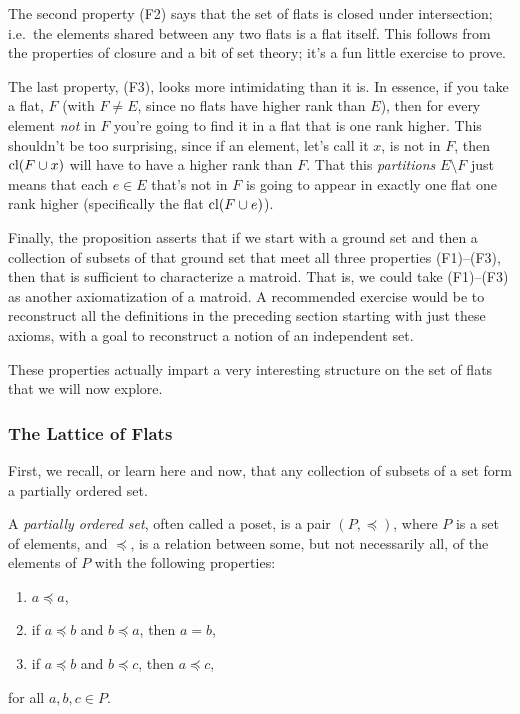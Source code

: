 \documentclass[12pt,oneside]{../../sfsuthesis}
\begin{document}
The second property (F2) says that the set of flats is closed under intersection;
i.e.\ the elements shared between any two flats is a flat itself.
This follows from the properties of closure and a bit of set theory; it's a fun little exercise to prove.

The last property, (F3), looks more intimidating than it is.
In essence, if you take a flat, \( F \) (with \( F \neq E \), since no flats have higher rank than \( E \)), then for every element \emph{not} in \( F \) you're going to find it in a flat that is one rank higher.
This shouldn't be too surprising, since if an element, let's call it \( x \), is not in \( F \), then \( \operatorname{cl}(F \cup x) \) will have to have a higher rank than \( F \).
That this \emph{partitions} \( E \setminus F \) just means that each \( e \in E \) that's not in \( F \) is going to appear in exactly one flat one rank higher (specifically the flat \( \operatorname{cl}(F \cup e) \)).

Finally, the proposition asserts that if we start with a ground set and then a collection of subsets of that ground set that meet all three properties (F1)--(F3), then that is sufficient to characterize a matroid.
That is, we could take (F1)--(F3) as another axiomatization of a matroid.
A recommended exercise would be to reconstruct all the definitions in the preceding section starting with just these axioms, with a goal to reconstruct a notion of an independent set.

These properties actually impart a very interesting structure on the set of flats that we will now explore.

\subsubsection{The Lattice of Flats}

First, we recall, or learn here and now, that any collection of subsets of a set form a partially ordered set.

\begin{definition}\th\label{def:poset}
    A \emph{partially ordered set}, often called a poset, is a pair \( (P, \preceq) \), where \( P \) is a set of elements, and \( \preceq \), is a relation between some, but not necessarily all, of the elements of \( P \) with the following properties:
    \begin{enumerate}[label=\roman*.]
        \item\(a \preceq a\),
        \item if \( a \preceq b \) and \( b \preceq a \), then \( a = b \),
        \item if \( a \preceq b \) and \( b \preceq c \), then \( a \preceq c \),
    \end{enumerate}
    for all \( a, b, c \in P \).
\end{definition}
\end{document}
